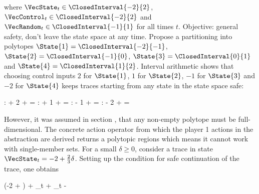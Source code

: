     where $\VecState_t \in \ClosedInterval{-2}{2}$, $\VecControl_t \in \ClosedInterval{-2}{2}$ and $\VecRandom_t \in \ClosedInterval{-1}{1}$ for all times $t$.
    Objective: general safety, don't leave the state space at any time.
    Propose a partitioning into polytopes $\State{1} = \ClosedInterval{-2}{-1}$, $\State{2} = \ClosedInterval{-1}{0}$, $\State{3} = \ClosedInterval{0}{1}$ and $\State{4} = \ClosedInterval{1}{2}$.
    Interval arithmetic shows that choosing control inputs $2$ for $\State{1}$, $1$ for $\State{2}$, $-1$ for $\State{3}$ and $-2$ for $\State{4}$ keeps traces starting from any state in the state space safe:

    \startformula
        \startalign[n=4,align={right,right,left,left}]
            \NC {}:
             \cdot {} + 2 + 
            \NC = 
            \NC \subseteq \StateSpace
            \NR
            \NC {}:
             \cdot {} + 1 + 
            \NC = 
            \NC \subseteq \StateSpace
            \NR
            \NC {}:
             \cdot {} - 1 + 
            \NC = 
            \NC \subseteq \StateSpace
            \NR
            \NC {}:
             \cdot {} - 2 + 
            \NC = 
            \NC \subseteq \StateSpace \EndPeriod
            \NR
        \stopalign
    \stopformula

    However, it was assumed in section , that any non-empty polytope must be full-dimensional.
    The concrete action operator from which the player 1 actions in the abstraction are derived returns a polytopic regions which means it cannot work with single-member sets.
    For a small $\delta \ge 0$, consider a trace in state $\VecState_t = -2 + \frac{2}{3} \delta$.
    Setting up the condition for safe continuation of the trace, one obtains

    \startformula
        \startalign[n=3,align={middle,right,left}]
            \NC \empty
             \Big({-2} +  \delta\Big) + \VecControl_t + 
            \NC \subseteq {}
            \NR
            \NC \Leftrightarrow \quad
            \NC {}
            \NC \subseteq {}
            \NR
            \NC \Rightarrow \quad
            \NC \VecControl_t
            \NC {} - \delta
            \NR
        \stopalign
    \stopformula

